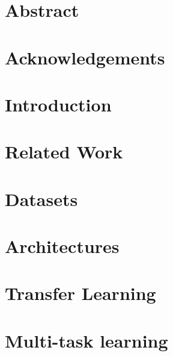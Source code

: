 \documentclass[12pt,twoside]{book}
\begin{document}
\afterpage{\blankpage}

\frontmatter

\chapter*{Abstract}


\chapter*{Acknowledgements}%
%


\tableofcontents

\listoffigures

\listoftables

\mainmatter

\chapter{Introduction} \label{ch:introduction}


\chapter{Related Work} \label{ch:related work}


\chapter{Datasets} \label{ch:datasets}


\chapter{Architectures} \label{ch:architectures}


\chapter{Transfer Learning} \label{ch:transfer learning}


\chapter{Multi-task learning} \label{ch:multi-task learning}

\end{document}

